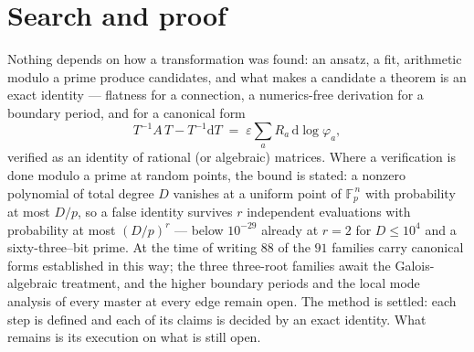 \documentclass[11pt]{article}
\newcommand{\eps}{\varepsilon}
\newcommand{\dd}{\mathrm{d}}
\newcommand{\Fp}{\mathbb{F}_p}
\begin{document}
\section{Search and proof}
Nothing depends on how a transformation was found: an ansatz, a fit,
arithmetic modulo a prime produce candidates, and what makes a
candidate a theorem is an exact identity --- flatness for a
connection, a numerics-free derivation for a boundary period, and
for a canonical form
\begin{equation}
  T^{-1}A\,T - T^{-1}\dd T
  \;=\; \eps \sum_a R_a\,\dd\log\varphi_a ,
\end{equation}
verified as an identity of rational (or algebraic) matrices.  Where a
verification is done modulo a prime at random points, the bound is
stated: a nonzero polynomial of total degree $D$ vanishes at a
uniform point of $\Fp^{\,n}$ with probability at most $D/p$, so a
false identity survives $r$ independent evaluations with probability
at most $(D/p)^r$ --- below $10^{-29}$ already at $r = 2$ for
$D \le 10^4$ and a sixty-three--bit prime.  At the time of writing
$88$ of the $91$ families carry canonical forms established in this
way; the three three-root families await the Galois-algebraic
treatment, and the higher boundary periods and the local mode
analysis of every master at every edge remain open.  The method is
settled: each step is defined and each of its claims is decided by an
exact identity.  What remains is its execution on what is still open.
\end{document}
